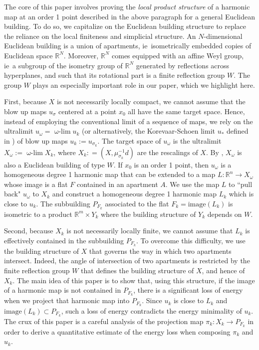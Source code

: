 \documentclass[12pt]{amsart}
\theoremstyle{definition}
\numberwithin{equation}{section}
\newcommand{\R}{\mathbb R}
\newcommand{\PFk}{P_{F_k}}
\newcommand\wlim{\mathop{\mbox{$\omega$-$\lim$}}}
\begin{document}
The core of this paper  involves proving the {\it local product structure} of a harmonic map at an order 1 point  described in the above paragraph for a general Euclidean building.  To do so,  we capitalize  on the Euclidean building structure to replace the reliance on the local finiteness and simplicial structure.  An $N$-dimensional Euclidean building is a union of apartments, ie~isometrically  embedded copies of Euclidean space $\R^N$.  Moreover, $\R^N$ comes equipped with an affine Weyl group, ie~a subgroup of the isometry group of $\R^N$ generated by reflections  across hyperplanes, and such that its  rotational part is a finite reflection group $W$.   The group $W$ plays an especially important role in our paper, which we highlight here.

First, because  $X$ is not necessarily locally compact, we cannot assume that the blow up maps $u_\sigma$ centered at a  point $x_0$ all have the same target space.  Hence, instead of employing the conventional limit of a sequence of maps, we rely on the ultralimit $u_\omega=\wlim u_k$ (or alternatively, the Korevaar-Schoen limit $u_*$ defined in \cite[Section 3]{korevaar-schoen2}) of blow up maps $u_k:=u_{\sigma_k}$.  The target space of $u_\omega$ is  the ultralimit $X_\omega:=\wlim X_k$, where $X_k: =(X,\mu_{\sigma_k}^{-1}d)$ are the rescalings of $X$. By \cite[Theorem 5.5.1]{kleiner-leeb}, $X_\omega$ is also a Euclidean building of type $W$.   If $x_0$ is an order 1 point, then $u_\omega$ is a homogeneous degree 1 harmonic map that can be extended to a map $L:\R^n \rightarrow X_\omega$ whose image is a flat $F$ contained in an apartment $A$. We use the map $L$  to ``pull back" $u_\omega$ to $X_k$ and  construct   a homogeneous degree 1 harmonic map $L_k$ which is close to  $u_k$.  The subbuilding $P_{F_k}$ associated to the flat $F_k=\mbox{image}(L_k)$ is isometric to a product $\R^m \times Y_k$ where the building structure of $Y_k$ depends on $W$.


Second, because $X_k$ is not necessarily locally finite,  we cannot assume that $L_k$ is  effectively contained in the subbuilding $\PFk$.  To overcome this difficulty, we use the building structure of $X$ that governs the way in which two apartments  intersect.  Indeed, the angle of intersection of two apartments is restricted by the finite reflection group $W$ that defines the building structure of $X$, and hence of $X_k$.  The main idea of this paper is to show that,  using this structure, if the image of a harmonic map is not contained in $\PFk$,  there is a significant loss of energy when we project that harmonic map into $\PFk$.  Since $u_k$ is close to $L_k$ and $\mbox{image}(L_k)\subset \PFk$, such a loss of energy contradicts the energy minimality of $u_k$.  The crux of this paper is a careful analysis of the projection map $\pi_k:X_k \rightarrow \PFk$ in order to derive a quantitative estimate of the energy loss when composing $\pi_k$ and  $u_k$.
\end{document}
